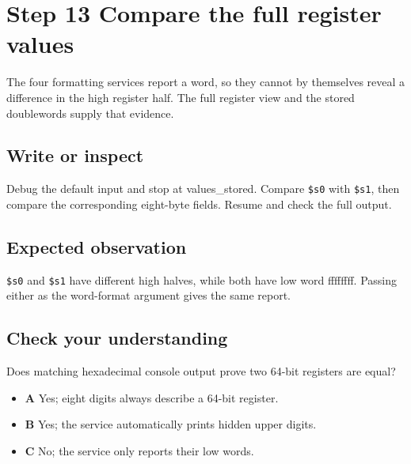 \section{Step 13 Compare the full register
  values}\label{004-bit-inspector-s13-step-13-compare-the-full-register-values}

The four formatting services report a word, so they cannot by themselves
reveal a difference in the high register half. The full register view
and the stored doublewords supply that evidence.

\subsection{Write or
  inspect}\label{004-bit-inspector-s13-write-or-inspect}

Debug the default input and stop at values\_stored. Compare
\texttt{\$s0} with \texttt{\$s1}, then compare the corresponding
eight-byte fields. Resume and check the full output.

\subsection{Expected
  observation}\label{004-bit-inspector-s13-expected-observation}

\texttt{\$s0} and \texttt{\$s1} have different high halves, while both
have low word ffffffff. Passing either as the word-format argument gives
the same report.

\subsection{Check your
  understanding}\label{004-bit-inspector-s13-check-your-understanding}

Does matching hexadecimal console output prove two 64-bit registers are
equal?

\begin{itemize}
  \tightlist
  \item
        \textbf{A} Yes; eight digits always describe a 64-bit register.
  \item
        \textbf{B} Yes; the service automatically prints hidden upper digits.
  \item
        \textbf{C} No; the service only reports their low words.
\end{itemize}
